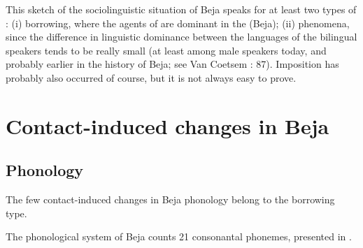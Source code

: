 \documentclass[output=paper]{langsci/langscibook}
\begin{document}
This sketch of the sociolinguistic situation of Beja speaks for at least two types of : (i) borrowing, where the agents of  are dominant in the  (Beja); (ii)  phenomena, since the difference in linguistic dominance between the languages of the bilingual speakers tends to be really small (at least among male speakers today, and probably earlier in the history of Beja; see Van Coetsem \citeyear{VanCoetsem1988}: 87). Imposition has probably also occurred of course, but it is not always easy to prove.


 \section{Contact-induced changes in Beja}


 \subsection{Phonology}


The few contact-induced changes in Beja phonology belong to the borrowing type.

The phonological system of Beja counts 21 consonantal phonemes, presented in .

\begin{table}[H]
\caption{Beja consonants}
\label{tab:vanhove:1}
\end{table}
\end{document}
